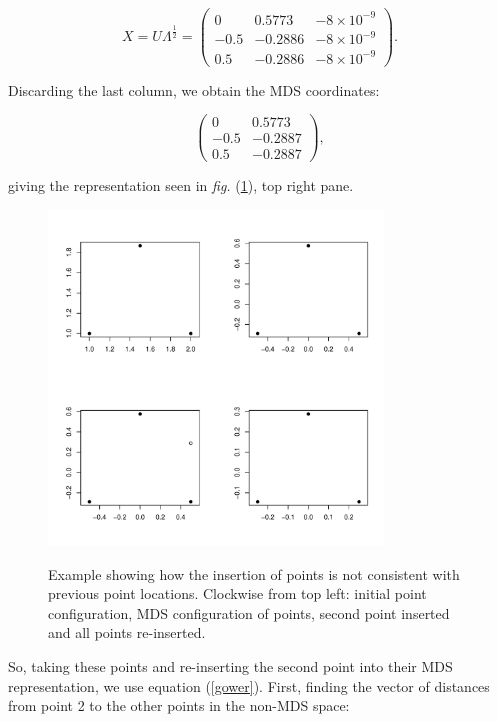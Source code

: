 \documentclass[a4paper,10pt]{article}
\newcommand{\fig}[1]{\emph{fig.} (\ref{#1})}
\newcommand{\cross}{\times}
\begin{document}
\begin{equation*}
X=U\Lambda^{\frac{1}{2}}= \begin{pmatrix} 
	0 & 0.5773 & -8\cross10^{-9}\\
	-0.5 & -0.2886 & -8\cross10^{-9}\\ 
	0.5 & -0.2886 & -8\cross10^{-9}
	\end{pmatrix}.
\end{equation*}

Discarding the last column, we obtain the MDS coordinates:

\begin{equation}
\begin{pmatrix} 
	0 & 0.5773\\
	-0.5 & -0.2887\\ 
	0.5 & -0.2887
	\end{pmatrix},
\label{origMDScoords}
\end{equation}

giving the representation seen in \fig{cexample}, top right pane.

\begin{figure}
\centering
\includegraphics[width=3.5in]{figs/cexample-fig.pdf} \\
\caption{Example showing how the insertion of points is not consistent with previous point locations. Clockwise from top left: initial point configuration, MDS configuration of points, second point inserted and all points re-inserted.}
\label{cexample}
\end{figure}

So, taking these points and re-inserting the second point into their MDS representation, we use equation (\ref{gower}). First, finding the vector of distances from point 2 to the other points in the non-MDS space:
\end{document}

